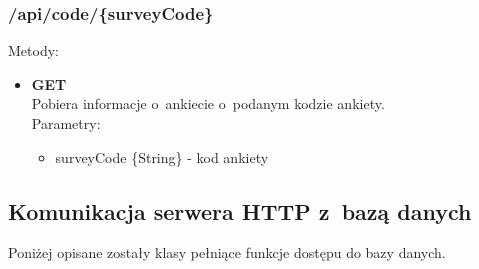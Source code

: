 \documentclass[12pt,a4paper,notitlepage]{article}
\begin{document}
\subsubsection{/api/code/\{surveyCode\}}
Metody:
\begin{itemize}
\item \textbf{GET} \\ Pobiera informacje o~ankiecie o~podanym kodzie ankiety. \\ Parametry:
	\begin{itemize}
	\item surveyCode \{String\} - kod ankiety
	\end{itemize}

\end{itemize}
\subsection{Komunikacja serwera HTTP z~bazą danych}
Poniżej opisane zostały klasy pełniące funkcje dostępu do bazy danych.
\newpage
\end{document}
